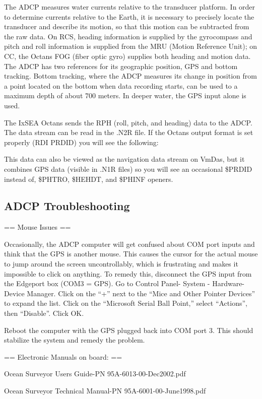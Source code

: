 \documentclass[]{book}
\theoremstyle{definition}
\theoremstyle{definition}
\theoremstyle{definition}
\theoremstyle{remark}
\begin{document}
The ADCP measures water currents relative to the transducer platform. In
order to determine currents relative to the Earth, it is necessary to
precisely locate the transducer and describe its motion, so that this
motion can be subtracted from the raw data. On RCS, heading information
is supplied by the gyrocompass and pitch and roll information is
supplied from the MRU (Motion Reference Unit); on CC, the Octans FOG
(fiber optic gyro) supplies both heading and motion data. The ADCP has
two references for its geographic position, GPS and bottom tracking.
Bottom tracking, where the ADCP measures its change in position from a
point located on the bottom when data recording starts, can be used to a
maximum depth of about 700 meters. In deeper water, the GPS input alone
is used.

The IxSEA Octans sends the RPH (roll, pitch, and heading) data to the
ADCP. The data stream can be read in the .N2R file. If the Octans output
format is set properly (RDI PRDID) you will see the following:

This data can also be viewed as the navigation data stream on VmDas, but
it combines GPS data (visible in .N1R files) so you will see an
occasional \$PRDID instead of, \$PHTRO, \$HEHDT, and \$PHINF openers.

\subsection{ADCP Troubleshooting}\label{adcp-troubleshooting}

== Mouse Issues ==

Occasionally, the ADCP computer will get confused about COM port inputs
and think that the GPS is another mouse. This causes the cursor for the
actual mouse to jump around the screen uncontrollably, which is
frustrating and makes it impossible to click on anything. To remedy
this, disconnect the GPS input from the Edgeport box (COM3 = GPS). Go to
Control Panel- System - Hardware- Device Manager. Click on the ``+''
next to the ``Mice and Other Pointer Devices'' to expand the list. Click
on the ``Microsoft Serial Ball Point,'' select ``Actions'', then
``Disable''. Click OK.

Reboot the computer with the GPS plugged back into COM port 3. This
should stabilize the system and remedy the problem.

== Electronic Manuals on board: ==

Ocean Surveyor Users Guide-PN 95A-6013-00-Dec2002.pdf

Ocean Surveyor Technical Manual-PN 95A-6001-00-June1998.pdf
\end{document}
